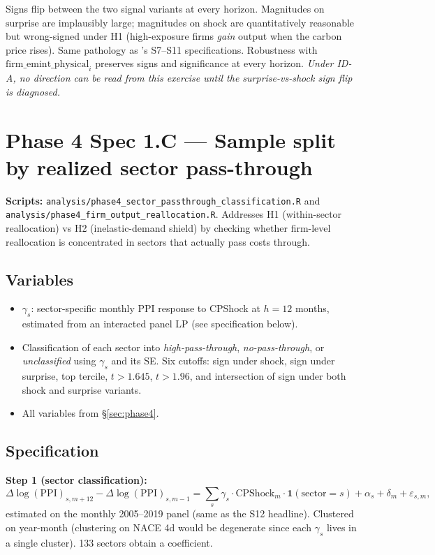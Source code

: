 \documentclass[11pt]{article}
\begin{document}
Signs flip between the two signal variants at every horizon. Magnitudes on $\mathrm{surprise}$ are implausibly large; magnitudes on $\mathrm{shock}$ are quantitatively reasonable but wrong-signed under H1 (high-exposure firms \emph{gain} output when the carbon price rises). Same pathology as \cite{passthrough}'s S7--S11 specifications. Robustness with $\mathrm{firm\_emint\_physical}_i$ preserves signs and significance at every horizon. \emph{Under ID-A, no direction can be read from this exercise until the surprise-vs-shock sign flip is diagnosed.}

\section{Phase 4 Spec 1.C --- Sample split by realized sector pass-through}

\textbf{Scripts:} \texttt{analysis/phase4\_sector\_passthrough\_classification.R} and \texttt{analysis/phase4\_firm\_output\_reallocation.R}. Addresses H1 (within-sector reallocation) vs H2 (inelastic-demand shield) by checking whether firm-level reallocation is concentrated in sectors that actually pass costs through.

\subsection{Variables}
\begin{itemize}
  \item $\gamma_s$: sector-specific monthly PPI response to CPShock at $h=12$ months, estimated from an interacted panel LP (see specification below).
  \item Classification of each sector into \emph{high-pass-through}, \emph{no-pass-through}, or \emph{unclassified} using $\gamma_s$ and its SE. Six cutoffs: sign under shock, sign under surprise, top tercile, $t>1.645$, $t>1.96$, and intersection of sign under both shock and surprise variants.
  \item All variables from \S\ref{sec:phase4}.
\end{itemize}

\subsection{Specification}

\textbf{Step 1 (sector classification):}
\begin{equation*}
  \Delta \log(\mathrm{PPI})_{s,m+12} - \Delta \log(\mathrm{PPI})_{s,m-1}
  = \sum_s \gamma_s \cdot \mathrm{CPShock}_m \cdot \mathbf{1}(\mathrm{sector}=s)
    + \alpha_s + \delta_m + \varepsilon_{s,m},
\end{equation*}
estimated on the monthly 2005--2019 panel (same as the S12 headline). Clustered on year-month (clustering on NACE 4d would be degenerate since each $\gamma_s$ lives in a single cluster). 133 sectors obtain a coefficient.
\end{document}
